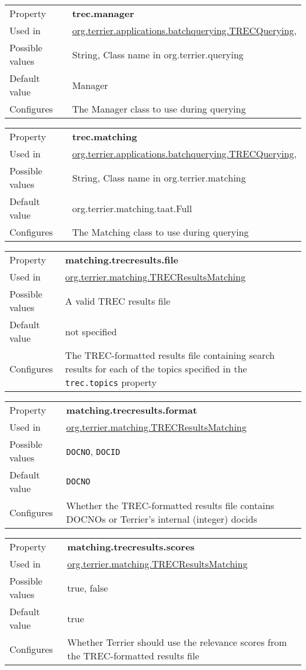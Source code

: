 \begin{longtable}[]{@{}ll@{}}
\toprule
Property & \textbf{trec.manager}\tabularnewline
Used in &
\href{javadoc/org/terrier/applications/batchquerying/TRECQuerying.html}{org.terrier.applications.batchquerying.TRECQuerying},\tabularnewline
Possible values & String, Class name in
org.terrier.querying\tabularnewline
Default value & Manager\tabularnewline
Configures & The Manager class to use during querying\tabularnewline
\bottomrule
\end{longtable}

\begin{longtable}[]{@{}ll@{}}
\toprule
Property & \textbf{trec.matching}\tabularnewline
Used in &
\href{javadoc/org/terrier/applications/batchquerying/TRECQuerying.html}{org.terrier.applications.batchquerying.TRECQuerying},\tabularnewline
Possible values & String, Class name in
org.terrier.matching\tabularnewline
Default value & org.terrier.matching.taat.Full\tabularnewline
Configures & The Matching class to use during querying\tabularnewline
\bottomrule
\end{longtable}

\begin{longtable}[]{@{}ll@{}}
\toprule
Property & \textbf{matching.trecresults.file}\tabularnewline
Used in &
\href{javadoc/org/terrier/matching/TRECResultsMatching.html}{org.terrier.matching.TRECResultsMatching}\tabularnewline
Possible values & A valid TREC results file\tabularnewline
Default value & not specified\tabularnewline
Configures & The TREC-formatted results file containing search results
for each of the topics specified in the \texttt{trec.topics}
property\tabularnewline
\bottomrule
\end{longtable}

\begin{longtable}[]{@{}ll@{}}
\toprule
Property & \textbf{matching.trecresults.format}\tabularnewline
Used in &
\href{javadoc/org/terrier/matching/TRECResultsMatching.html}{org.terrier.matching.TRECResultsMatching}\tabularnewline
Possible values & \texttt{DOCNO}, \texttt{DOCID}\tabularnewline
Default value & \texttt{DOCNO}\tabularnewline
Configures & Whether the TREC-formatted results file contains DOCNOs or
Terrier's internal (integer) docids\tabularnewline
\bottomrule
\end{longtable}

\begin{longtable}[]{@{}ll@{}}
\toprule
Property & \textbf{matching.trecresults.scores}\tabularnewline
Used in &
\href{javadoc/org/terrier/matching/TRECResultsMatching.html}{org.terrier.matching.TRECResultsMatching}\tabularnewline
Possible values & true, false\tabularnewline
Default value & true\tabularnewline
Configures & Whether Terrier should use the relevance scores from the
TREC-formatted results file\tabularnewline
\bottomrule
\end{longtable}

